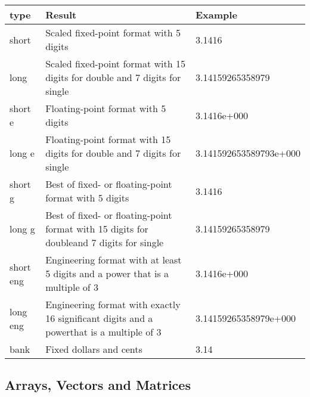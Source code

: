 \documentclass[../main.tex]{subfiles}
\begin{document}
\begin{table}[h]
	\centering
	\begin{tabular}{ l l l }
		\hline
		\textbf{type} &\textbf{Result} &\textbf{Example}\\
		\hline
		short 	&	Scaled fixed-point format with 5 digits &3.1416\\
		long	&	 Scaled fixed-point format with 15 digits for double and 7 digits for single& 3.14159265358979\\
		short e &		Floating-point format with 5 digits &3.1416e+000\\
		long e 	&	Floating-point format with 15 digits for double and 7 digits for single &3.141592653589793e+000\\
		short g	&	 Best of fixed- or floating-point format with 5 digits& 3.1416\\
		long g 	&	Best of fixed- or floating-point format with 15 digits for doubleand 7 digits for single &3.14159265358979\\
		short eng	& Engineering format with at least 5 digits and a power that is a multiple of 3 &3.1416e+000\\
		long eng 	&Engineering format with exactly 16 significant digits and a powerthat is a multiple of 3 &3.14159265358979e+000\\
		bank 	&	Fixed dollars and cents &3.14\\
		\hline
	\end{tabular}
\end{table}


\subsection{Arrays, Vectors and Matrices}
\end{document}
